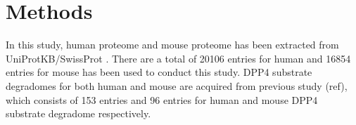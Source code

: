 \section{Methods}
In this study, human proteome and mouse proteome has been extracted from UniProtKB/SwissProt \cite{2007}. There are a total of 20106 entries for human and 16854 entries for mouse has been used to conduct this study. 
DPP4 substrate degradomes for both human and mouse are acquired from previous study (ref), which consists of 153 entries and 96 entries for human and mouse DPP4 substrate degradome respectively. 

